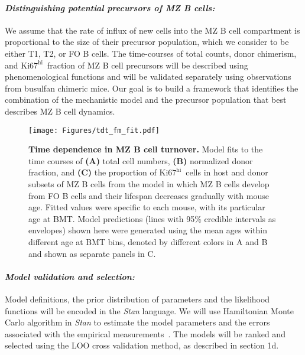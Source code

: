 \documentclass[11pt]{article}
\newcommand{\khi}{\ensuremath{\text{Ki67}^\text{hi}}~}
\newcommand{\para}[1]{\vspace*{-4.5mm}\paragraph{#1}}
\begin{document}
\para{\textit{Distinguishing potential precursors of MZ B cells:}}
We assume that the rate of influx of new cells into the MZ B cell compartment is proportional to the size of their precursor population, which we consider to be either T1, T2, or FO B cells.
The time-courses of total counts, donor chimerism, and \khi fraction of MZ B cell precursors will be described using phenomenological functions and will be validated separately using observations from busulfan chimeric mice.
Our goal is to build a framework that identifies the combination of the mechanistic model and the precursor population that best describes MZ B cell dynamics. %


\begin{wrapfigure}{r}{0.48\textwidth}
\centering
\vspace*{-5mm}
\texttt{[image: Figures/tdt\_fm\_fit.pdf]}
\vspace*{-3mm}
\caption{\textbf{Time dependence in MZ B cell turnover.} 
Model fits to the time courses of \textbf{(A)} total cell numbers, \textbf{(B)} normalized donor fraction, and  \textbf{(C)} the proportion of \khi cells in host and donor subsets of MZ B cells from the model in which MZ B cells develop from FO B cells and their lifespan decreases gradually with mouse age. Fitted values were specific to each mouse, with its particular age at BMT. 
Model predictions (lines with 95\% credible intervals as envelopes) shown here were generated using the mean ages within different age at BMT bins, denoted by different colors in A and B and shown as separate panels in C.}
\label{fig:model-fit}
\vspace*{-6mm}
\end{wrapfigure}

\para{\textit{Model validation and selection:}}
Model definitions, the prior distribution of parameters and the likelihood functions will be encoded in the \textit{Stan} language.
We will use Hamiltonian Monte Carlo algorithm in \textit{Stan} to estimate the model parameters and the errors associated with the empirical measurements~\cite{Stan_cite}.
The models will be ranked and selected using the LOO cross validation method, as described in section 1d. %
\end{document}

